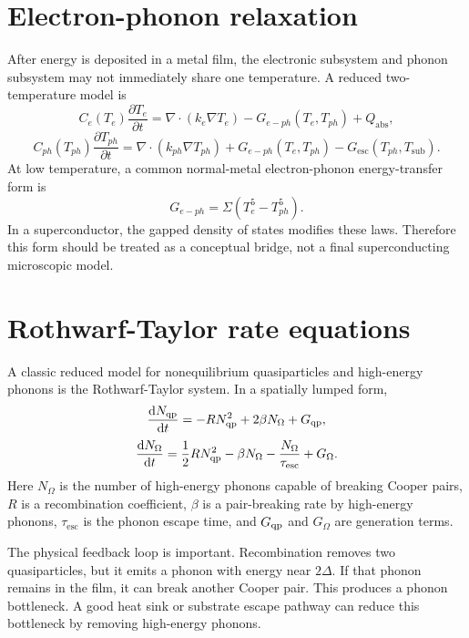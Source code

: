 \documentclass[11pt]{article}
\begin{document}
\section{Electron-phonon relaxation}
After energy is deposited in a metal film, the electronic subsystem and phonon subsystem may not immediately share one temperature. A reduced two-temperature model is
\begin{equation}
C_e(T_e)\frac{\partial T_e}{\partial t}=\nabla\cdot(k_e\nabla T_e)-G_{e-ph}(T_e,T_{ph})+Q_{\mathrm{abs}},
\end{equation}
\begin{equation}
C_{ph}(T_{ph})\frac{\partial T_{ph}}{\partial t}=\nabla\cdot(k_{ph}\nabla T_{ph})+G_{e-ph}(T_e,T_{ph})-G_{\mathrm{esc}}(T_{ph},T_{\mathrm{sub}}).
\end{equation}
At low temperature, a common normal-metal electron-phonon energy-transfer form is
\begin{equation}
G_{e-ph}=\Sigma\left(T_e^5-T_{ph}^5\right).
\end{equation}
In a superconductor, the gapped density of states modifies these laws. Therefore this form should be treated as a conceptual bridge, not a final superconducting microscopic model.

\section{Rothwarf-Taylor rate equations}
A classic reduced model for nonequilibrium quasiparticles and high-energy phonons is the Rothwarf-Taylor system. In a spatially lumped form,
\begin{equation}
\frac{\dd N_{\mathrm{qp}}}{\dd t}=-R N_{\mathrm{qp}}^2+2\beta N_\Omega+G_{\mathrm{qp}},
\end{equation}
\begin{equation}
\frac{\dd N_\Omega}{\dd t}=\frac{1}{2}R N_{\mathrm{qp}}^2-\beta N_\Omega-\frac{N_\Omega}{\tau_{\mathrm{esc}}}+G_\Omega.
\end{equation}
Here $N_\Omega$ is the number of high-energy phonons capable of breaking Cooper pairs, $R$ is a recombination coefficient, $\beta$ is a pair-breaking rate by high-energy phonons, $\tau_{\mathrm{esc}}$ is the phonon escape time, and $G_{\mathrm{qp}}$ and $G_\Omega$ are generation terms.

The physical feedback loop is important. Recombination removes two quasiparticles, but it emits a phonon with energy near $2\Delta$. If that phonon remains in the film, it can break another Cooper pair. This produces a phonon bottleneck. A good heat sink or substrate escape pathway can reduce this bottleneck by removing high-energy phonons.
\end{document}
